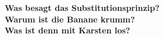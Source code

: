 \documentclass[10pt,a4paper]{article}
\begin{document}
\textbf{Was besagt das Substitutionsprinzip?}\\
\textbf{Warum ist die Banane krumm?}\\
\textbf{Was ist denn mit Karsten los?}\\
\end{document}
